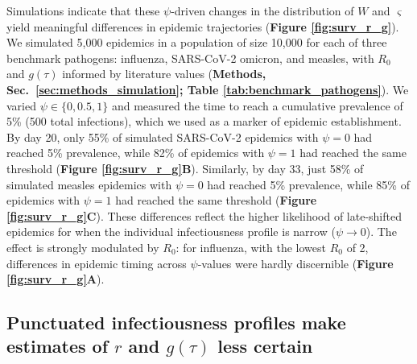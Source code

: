 Simulations indicate that these $\psi$-driven changes in the distribution of $W$ and $\varsigma$ yield meaningful differences in epidemic trajectories ({\bf Figure \ref{fig:surv_r_g}}). We simulated 5,000 epidemics in a population of size 10,000 for each of three benchmark pathogens: influenza, SARS-CoV-2 omicron, and measles, with $R_0$ and $g(\tau)$ informed by literature values ({\bf Methods, Sec.~\ref{sec:methods_simulation}; Table \ref{tab:benchmark_pathogens}}). We varied $\psi \in \{0, 0.5, 1\}$ and measured the time to reach a cumulative prevalence of 5\% (500 total infections), which we used as a marker of epidemic establishment. By day 20, only 55\% of simulated SARS-CoV-2 epidemics with $\psi = 0$ had reached 5\% prevalence, while 82\% of epidemics with $\psi = 1$ had reached the same threshold ({\bf Figure \ref{fig:surv_r_g}B}). Similarly, by day 33, just 58\% of simulated measles epidemics with $\psi = 0$ had reached 5\% prevalence, while 85\% of epidemics with $\psi = 1$ had reached the same threshold ({\bf Figure \ref{fig:surv_r_g}C}). These differences reflect the higher likelihood of late-shifted epidemics for when the individual infectiousness profile is narrow ($\psi \rightarrow 0$). The effect is strongly modulated by $R_0$: for influenza, with the lowest $R_0$ of 2, differences in epidemic timing across $\psi$-values were hardly discernible ({\bf Figure \ref{fig:surv_r_g}A}). 


\subsection{Punctuated infectiousness profiles make estimates of $r$ and $g(\tau)$ less certain}
\label{sec:results_r-g-uncertainty}

